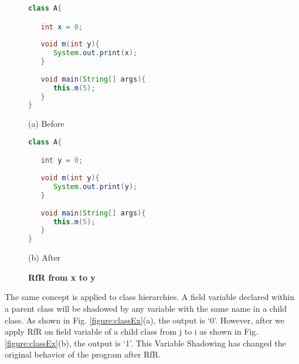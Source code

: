 \begin{figure}[th]
\centering
\begin{minipage}[t]{0.47\linewidth}
\begin{lstlisting}[language=java, basicstyle=\scriptsize\ttfamily,frame=single]
class A{

   int x = 0;
	
   void m(int y){
      System.out.print(x);
   }
	
   void main(String[] args){
      this.m(5);
   }
}

\end{lstlisting}
\centering(a) Before
\end{minipage}
\hfill
\begin{minipage}[t]{0.47\linewidth}
\begin{lstlisting}[language=java, basicstyle=\scriptsize\ttfamily,frame=single]
class A{

   int y = 0;
	
   void m(int y){
      System.out.print(y);
   }
	
   void main(String[] args){
      this.m(5);
   }
}\end{lstlisting}
\centering(b) After
\end{minipage}
\caption{\textbf{RfR from x to y}}
\label{figure:sameBlock}
\end{figure}

The same concept is applied to class hierarchies. A field variable declared within a parent class will be shadowed by any variable with the same name in a child class. As shown in Fig. \ref{figure:classEx}(a), the output is `0'. However, after we apply RfR on field variable of a child class from j to i as shown in Fig. \ref{figure:classEx}(b), the output is `1'. This Variable Shadowing has changed the original behavior of the program after RfR. 

